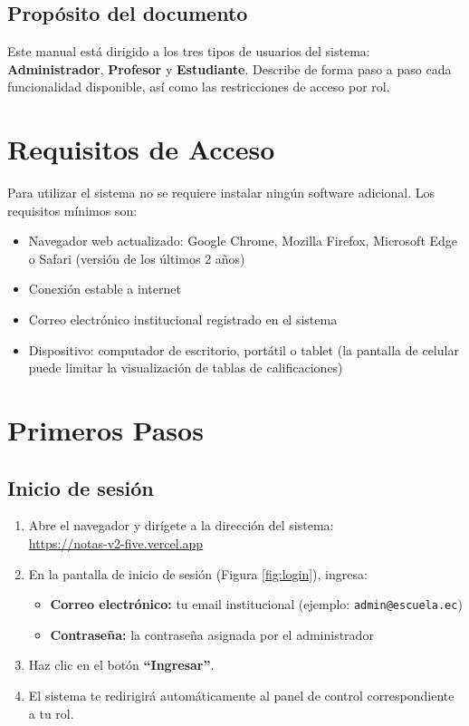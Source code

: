 \documentclass[12pt, a4paper]{article}
\newcommand{\rol}[2]{\textcolor{#1}{\textbf{#2}}}
\begin{document}
\subsection{Propósito del documento}

Este manual está dirigido a los tres tipos de usuarios del sistema: \rol{admincolor}{Administrador}, \rol{profcolor}{Profesor} y \rol{estudcolor}{Estudiante}. Describe de forma paso a paso cada funcionalidad disponible, así como las restricciones de acceso por rol.

\section{Requisitos de Acceso}

Para utilizar el sistema no se requiere instalar ningún software adicional. Los requisitos mínimos son:

\begin{itemize}
    \item Navegador web actualizado: Google Chrome, Mozilla Firefox, Microsoft Edge o Safari (versión de los últimos 2 años)
    \item Conexión estable a internet
    \item Correo electrónico institucional registrado en el sistema
    \item Dispositivo: computador de escritorio, portátil o tablet (la pantalla de celular puede limitar la visualización de tablas de calificaciones)
\end{itemize}

\section{Primeros Pasos}

\subsection{Inicio de sesión}

\begin{enumerate}
    \item Abre el navegador y dirígete a la dirección del sistema:\\
          \url{https://notas-v2-five.vercel.app}
    \item En la pantalla de inicio de sesión (Figura \ref{fig:login}), ingresa:
    \begin{itemize}
        \item \textbf{Correo electrónico:} tu email institucional (ejemplo: \texttt{admin@escuela.ec})
        \item \textbf{Contraseña:} la contraseña asignada por el administrador
    \end{itemize}
    \item Haz clic en el botón \textbf{``Ingresar''}.
    \item El sistema te redirigirá automáticamente al panel de control correspondiente a tu rol.
\end{enumerate}
\end{document}

